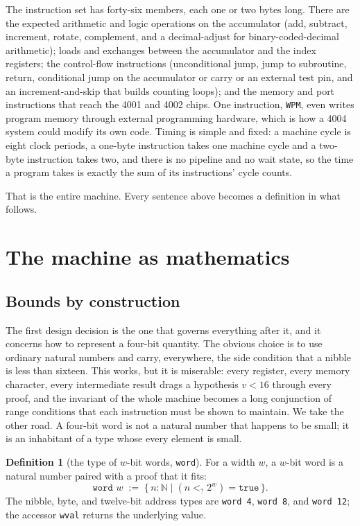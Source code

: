 \documentclass[11pt]{amsart}
\theoremstyle{plain}
\theoremstyle{definition}
\newtheorem{definition}[theorem]{Definition}
\newcommand{\code}[1]{\texttt{#1}}
\newcommand{\N}{\mathbb{N}}
\begin{document}
The instruction set has forty-six members, each one or two bytes long. There are the expected arithmetic and logic operations on the accumulator (add, subtract, increment, rotate, complement, and a decimal-adjust for binary-coded-decimal arithmetic); loads and exchanges between the accumulator and the index registers; the control-flow instructions (unconditional jump, jump to subroutine, return, conditional jump on the accumulator or carry or an external test pin, and an increment-and-skip that builds counting loops); and the memory and port instructions that reach the 4001 and 4002 chips. One instruction, \code{WPM}, even writes program memory through external programming hardware, which is how a 4004 system could modify its own code. Timing is simple and fixed: a machine cycle is eight clock periods, a one-byte instruction takes one machine cycle and a two-byte instruction takes two, and there is no pipeline and no wait state, so the time a program takes is exactly the sum of its instructions' cycle counts.

That is the entire machine. Every sentence above becomes a definition in what follows.

\section{The machine as mathematics}\label{sec:math}

\subsection{Bounds by construction}

The first design decision is the one that governs everything after it, and it concerns how to represent a four-bit quantity. The obvious choice is to use ordinary natural numbers and carry, everywhere, the side condition that a nibble is less than sixteen. This works, but it is miserable: every register, every memory character, every intermediate result drags a hypothesis $v < 16$ through every proof, and the invariant of the whole machine becomes a long conjunction of range conditions that each instruction must be shown to maintain. We take the other road. A four-bit word is not a natural number that happens to be small; it is an inhabitant of a type whose every element is small.

\begin{definition}[the type of $w$-bit words, \code{word}]\label{def:word}
For a width $w$, a $w$-bit word is a natural number paired with a proof that it fits:
\[
  \code{word } w \;:=\; \{\, n : \N \mid (n <_? 2^w) = \code{true} \,\}.
\]
The nibble, byte, and twelve-bit address types are \code{word 4}, \code{word 8}, and \code{word 12}; the accessor \code{wval} returns the underlying value.
\end{definition}
\end{document}
